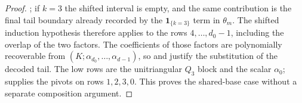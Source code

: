 \begin{proof}
      ; if $k=3$ the shifted interval is empty,
      and the same contribution is the final tail boundary already recorded by the
      $\mathbf 1_{\{k=3\}}$ term in $\theta_m$.  The shifted induction
      hypothesis therefore applies to the rows $4,\ldots,d_0-1$, including
      the overlap of the two factors.  The coefficients of those factors are
      polynomially recoverable from
      $(K;\alpha_{d_0},\ldots,\alpha_{d-1})$, so
       and
       justify the substitution of
      the decoded tail.  The low rows are the unitriangular $Q_3$ block and
      the scalar $\alpha_0$;  supplies the pivots on
      rows $1,2,3,0$.  This proves the shared-base case without a
      separate composition argument.


\end{proof}
